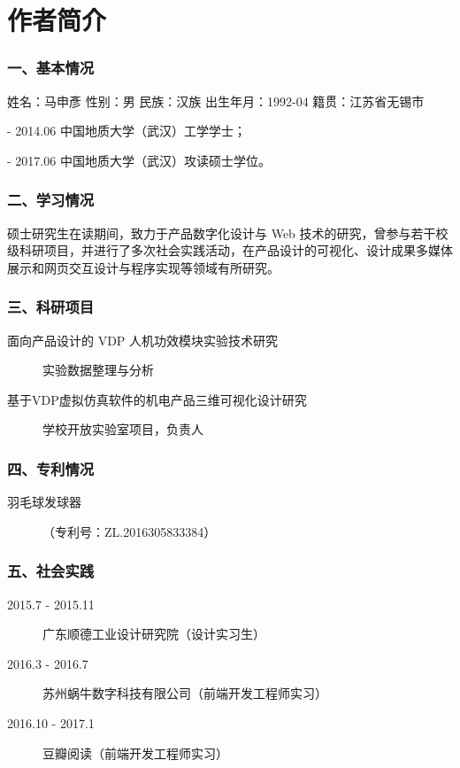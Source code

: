 \chapter*{作者简介}
\begin{spacing}{1.3}

\subsection*{一、基本情况}
姓名：马申彥 \quad 性别：男 \quad 民族：汉族 \quad  出生年月：1992-04 \quad 籍贯：江苏省无锡市

\qquad{} - 2014.06 中国地质大学（武汉）工学学士；

\qquad{} - 2017.06 中国地质大学（武汉）攻读硕士学位。

\subsection*{二、学习情况}
硕士研究生在读期间，致力于产品数字化设计与 Web 技术的研究，曾参与若干校级科研项目，并进行了多次社会实践活动，在产品设计的可视化、设计成果多媒体展示和网页交互设计与程序实现等领域有所研究。

% 
\end{spacing}

\subsection*{三、科研项目}
\begin{description}
	\item[面向产品设计的 VDP 人机功效模块实验技术研究] 实验数据整理与分析
	\item[基于VDP虚拟仿真软件的机电产品三维可视化设计研究] 学校开放实验室项目，负责人
\end{description}

\vskip 12pt

\subsection*{四、专利情况}
\begin{description}
	\item[羽毛球发球器]（专利号：ZL.2016305833384）
\end{description}

\vskip 12pt

\subsection*{五、社会实践}
\begin{description}
	\item[2015.7 - 2015.11] 广东顺德工业设计研究院（设计实习生）
	\item[2016.3 - 2016.7] 苏州蜗牛数字科技有限公司（前端开发工程师实习）
	\item[2016.10 - 2017.1] 豆瓣阅读（前端开发工程师实习）
\end{description}